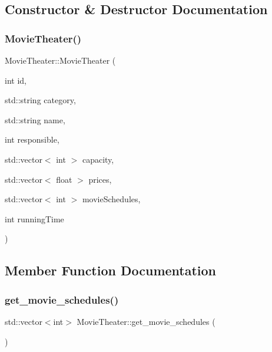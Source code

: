\subsection{Constructor \& Destructor Documentation}
\mbox{\label{class_movie_theater_a917c9c9139916fdf9712da31e0453b93}} 
\subsubsection{\texorpdfstring{Movie\+Theater()}{MovieTheater()}}
{\footnotesize\ttfamily Movie\+Theater\+::\+Movie\+Theater (\begin{DoxyParamCaption}\item[{int}]{id,  }\item[{std\+::string}]{category,  }\item[{std\+::string}]{name,  }\item[{int}]{responsible,  }\item[{std\+::vector$<$ int $>$}]{capacity,  }\item[{std\+::vector$<$ float $>$}]{prices,  }\item[{std\+::vector$<$ int $>$}]{movie\+Schedules,  }\item[{int}]{running\+Time }\end{DoxyParamCaption})}



\subsection{Member Function Documentation}
\mbox{\label{class_movie_theater_af8be0f4a4af131cbbd00ccf06644804e}} 
\subsubsection{\texorpdfstring{get\+\_\+movie\+\_\+schedules()}{get\_movie\_schedules()}}
{\footnotesize\ttfamily std\+::vector$<$int$>$ Movie\+Theater\+::get\+\_\+movie\+\_\+schedules (\begin{DoxyParamCaption}{ }\end{DoxyParamCaption})\hspace{0.3cm}{\ttfamily [inline]}}

